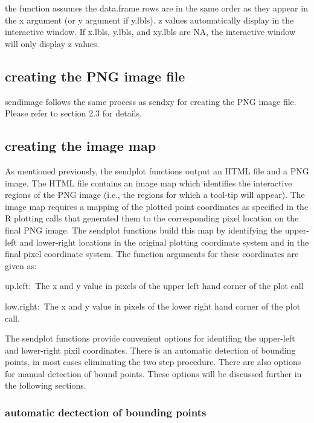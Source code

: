 \documentclass[]{article}
\begin{document}
 the function assumes the data.frame rows are in the same order as they appear in the x argument (or y argument if y.lbls).  \newline
{} z values automatically display in the interactive window. If x.lbls, y.lbls, and xy.lbls are NA, the interactive window will only display z values. 


\subsection{creating the PNG image file}

\indent sendimage follows the same process as sendxy for creating the PNG image file. Please refer to section 2.3 for details.

\subsection{creating the image map}

As mentioned previously, the sendplot functions output an HTML file and a PNG image. The HTML file contains an image map which identifies the interactive regions of the PNG image (i.e., the regions for which a tool-tip will appear). The image map requires a mapping of the plotted point coordinates as specified in the R plotting calls that generated them to the corresponding pixel location on the final PNG image. The sendplot functions build this map by identifying the upper-left and lower-right locations in the original plotting coordinate system and in the final pixel coordinate system. The function arguments for these coordinates are given as:
\begin{description}
  \item{up.left:~}{The x and y value in pixels of the upper left hand
    corner of the plot call}
  \item{low.right:~}{The x and y value in pixels of the lower right hand
    corner of the plot call.}
\end{description}

\indent The sendplot functions provide convenient options for identifing the upper-left and lower-right pixil coordinates. There is an automatic detection of bounding points, in most cases eliminating the two step procedure. There are also options for manual detection of bound points. These options will be discussed further in the following sections.  

\subsubsection{automatic dectection of bounding points}
\end{document}
